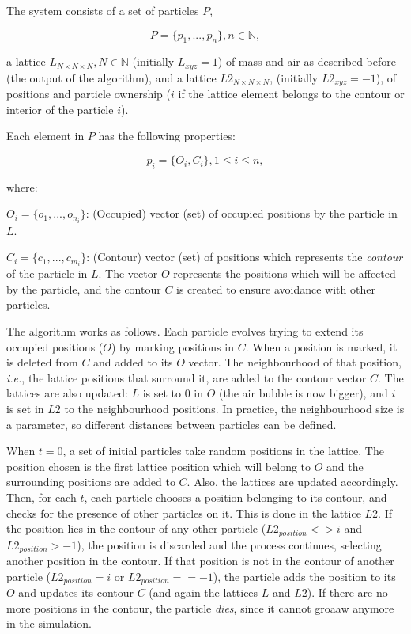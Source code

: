 \documentclass[oneside,a4paper,english,links]{amca}
\begin{document}
The system consists of a set of particles $P$, 

\begin{equation}
  P = \{p_{1}, ... , p_{n}\}, n  \in \mathbb{N},
\end{equation}

a lattice $L_{N\times N \times N}, N \in \mathbb{N} $ (initially $L_{xyz}=1$) of mass and air as described before (the output of the algorithm), and a lattice $L2_{N\times N \times N}$, (initially $L2_{xyz}=-1$), of positions and particle ownership ($i$ if the lattice element belongs to the contour or interior of the particle $i$).

Each element in $P$ has the following properties:

\begin{equation}
  p_{i} = \{O_{i}, C_{i}\}, 1 \le i \le n,
\end{equation}

where:

$O_{i} = \{o_{1}, ... , o_{n_{i}}\}$: (Occupied) vector (set) of occupied positions by the particle in $L$.

$C_{i} = \{c_{1}, ... , c_{m_{i}}\}$: (Contour) vector (set) of positions which represents the {\em contour} of the particle in $L$. The vector $O$ represents the positions which will be affected by the particle, and the contour $C$ is created to ensure avoidance with other particles.

The algorithm works as follows. Each particle evolves trying to extend
its occupied positions ($O$) by marking positions in $C$. When a
position is marked, it is deleted from $C$ and added to its $O$
vector. The neighbourhood of that position, {\em i.e.}, the lattice
positions that surround it, are added to the contour vector $C$. The
lattices are also updated: $L$ is set to $0$ in $O$ (the air
bubble is now bigger), and $i$ is set in $L2$ to the neighbourhood
positions. In practice, the neighbourhood size is a parameter, so
different distances between particles can be defined.

When $t = 0$, a set of initial particles take random positions in the lattice. The position chosen is the first lattice position which will belong to $O$ and the surrounding positions are added to $C$. Also, the lattices are updated accordingly. Then, for each $t$, each particle chooses a position belonging to its contour, and checks for the presence of other particles on it. This is done in the lattice $L2$. If the position lies in the contour of any other particle ($L2_{position} <> i$ and $L2_{position} > -1$), the position is discarded and the process continues, selecting another position in the contour. If that position is not in the contour of another particle ($L2_{position} = i$ or $L2_{position} == -1$), the particle adds the position to its $O$ and updates its contour $C$ (and again the lattices $L$ and $L2$). If there are no more positions in the contour, the particle {\em dies}, since it cannot groaaw anymore in the simulation.
\end{document}
